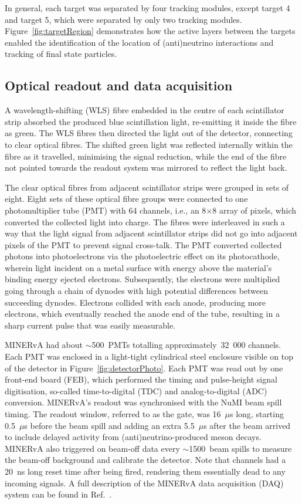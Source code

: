 In general, each target was separated by four tracking modules, except target 4 and target 5, which were separated by only two tracking modules. \enlargethispage{1\baselineskip} Figure~\ref{fig:targetRegion} demonstrates how the active layers between the targets enabled the identification of the location of (anti)neutrino interactions and tracking of final state particles. 

\subsection{Optical readout and data acquisition}\label{sec:opticalReadout}

A wavelength-shifting (WLS) fibre embedded in the centre of each scintillator strip absorbed the produced blue scintillation light, re-emitting it inside the fibre as green. The WLS fibres then directed the light out of the detector, connecting to clear optical fibres. The shifted green light was reflected internally within the fibre as it travelled, minimising the signal reduction, while the end of the fibre not pointed towards the readout system was mirrored to reflect the light back.

The clear optical fibres from adjacent scintillator strips were grouped in sets of eight. Eight sets of these optical fibre groups were connected to one photomultiplier tube (PMT) with 64 channels, i.e., an 8×8 array of pixels, which converted the collected light into charge. The fibres were interleaved in such a way that the light signal from adjacent scintillator strips did not go into adjacent pixels of the PMT to prevent signal cross-talk. The PMT converted collected photons into photoelectrons via the photoelectric effect on its photocathode, wherein light incident on a metal surface with energy above the material's binding energy ejected electrons. Subsequently, the electrons were multiplied going through a chain of dynodes with high potential differences between succeeding dynodes. Electrons collided with each anode, producing more electrons, which eventually reached the anode end of the tube, resulting in a sharp current pulse that was easily measurable. 

MINERvA had about $\sim$500~PMTs totalling approximately~32~000 channels. Each PMT was enclosed in a light-tight cylindrical steel enclosure visible on top of the detector in Figure~\ref{fig:detectorPhoto}. Each PMT was read out by one front-end board (FEB), which performed the timing and pulse-height signal digitisation, so-called time-to-digital (TDC) and analog-to-digital (ADC) conversion. MINERvA's readout was synchronised with the NuMI beam spill timing. The readout window, referred to as the gate, was 16~$\mu$s long, starting 0.5~$\mu$s before the beam spill and adding an extra 5.5~$\mu$s after the beam arrived to include delayed activity from (anti)neutrino-produced meson decays. MINERvA also triggered on beam-off data every $\sim$1500~beam spills to measure the beam-off background and calibrate the detector. Note that channels had a 20~ns long reset time after being fired, rendering them essentially dead to any incoming signals. A full description of the MINERvA data acquisition (DAQ) system can be found in Ref.~\cite{DAQ_PERDUE2012179}.

